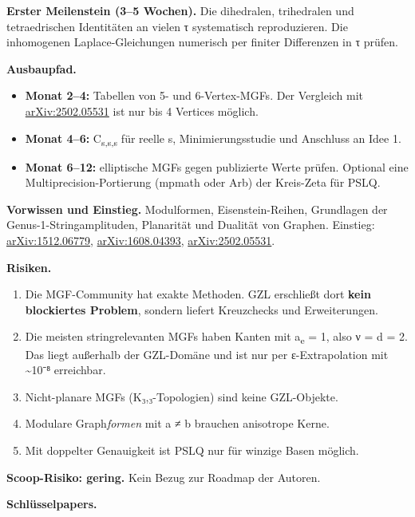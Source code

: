 \textbf{Erster Meilenstein (3--5 Wochen).} Die dihedralen, trihedralen und tetraedrischen Identitäten an vielen τ systematisch reproduzieren. Die inhomogenen Laplace-Gleichungen numerisch per finiter Differenzen in τ prüfen.

\textbf{Ausbaupfad.}

\begin{itemize}
\tightlist
\item
  \textbf{Monat 2--4:} Tabellen von 5- und 6-Vertex-MGFs. Der Vergleich mit \href{https://arxiv.org/abs/2502.05531}{arXiv:2502.05531} ist nur bis 4 Vertices möglich.
\item
  \textbf{Monat 4--6:} C\textsubscript{s,s,s} für reelle s, Minimierungsstudie und Anschluss an Idee 1.
\item
  \textbf{Monat 6--12:} elliptische MGFs gegen publizierte Werte prüfen. Optional eine Multiprecision-Portierung (mpmath oder Arb) der Kreis-Zeta für PSLQ.
\end{itemize}

\textbf{Vorwissen und Einstieg.} Modulformen, Eisenstein-Reihen, Grundlagen der Genus-1-Stringamplituden, Planarität und Dualität von Graphen. Einstieg: \href{https://arxiv.org/abs/1512.06779}{arXiv:1512.06779}, \href{https://arxiv.org/abs/1608.04393}{arXiv:1608.04393}, \href{https://arxiv.org/abs/2502.05531}{arXiv:2502.05531}.

\textbf{Risiken.}

\begin{enumerate}
\def\labelenumi{\arabic{enumi}.}
\tightlist
\item
  Die MGF-Community hat exakte Methoden. GZL erschließt dort \textbf{kein blockiertes Problem}, sondern liefert Kreuzchecks und Erweiterungen.
\item
  Die meisten stringrelevanten MGFs haben Kanten mit a\textsubscript{e} = 1, also ν = d = 2. Das liegt außerhalb der GZL-Domäne und ist nur per ε-Extrapolation mit \textasciitilde10⁻⁸ erreichbar.
\item
  Nicht-planare MGFs (K₃,₃-Topologien) sind keine GZL-Objekte.
\item
  Modulare Graph\emph{formen} mit a ≠ b brauchen anisotrope Kerne.
\item
  Mit doppelter Genauigkeit ist PSLQ nur für winzige Basen möglich.
\end{enumerate}

\textbf{Scoop-Risiko: gering.} Kein Bezug zur Roadmap der Autoren.

\textbf{Schlüsselpapers.}

